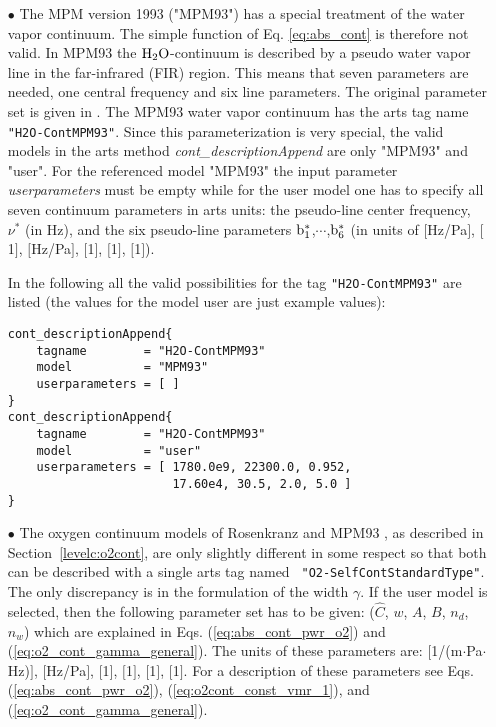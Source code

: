 \begin{itemize}
\item[$\bullet$] The MPM version 1993 ("MPM93") \citep{liebeetal:93} 
has a special treatment of the water vapor continuum. The simple 
function of Eq. \ref{eq:abs_cont} is therefore not valid. In MPM93 
the $\mbox{H}_2\mbox{O}$-continuum is described by a pseudo water vapor line in the 
far-infrared (FIR) region. This means that seven parameters are 
needed, one central frequency and six line parameters. The original 
parameter set is given in \cite{liebeetal:93}. The MPM93 water vapor 
continuum has the arts tag name {\tt "H2O-ContMPM93"}. Since this 
parameterization is very special, the valid models 
in the arts method {\it cont\_descriptionAppend} are only 
"MPM93" and "user". For the referenced model "MPM93" the 
input parameter {\it userparameters} must be empty while 
for the user model one has to specify all seven continuum 
parameters in arts units: the pseudo-line center frequency, 
$\nu^*$ (in Hz), and the six pseudo-line parameters $\rm b^*_{\rm 1}$,$\cdots$,$\rm b^*_{\rm 6}$ 
(in units of $[$Hz/Pa$]$, $[$1$]$, $[$Hz/Pa$]$, $[$1$]$, $[$1$]$, $[$1$]$).

In the following all the valid possibilities for the
tag {\tt "H2O-ContMPM93"} are listed (the values for the 
model user are just example values):
\begin{verbatim}
cont_descriptionAppend{
    tagname        = "H2O-ContMPM93"
    model          = "MPM93"
    userparameters = [ ]
}
cont_descriptionAppend{
    tagname        = "H2O-ContMPM93"
    model          = "user"
    userparameters = [ 1780.0e9, 22300.0, 0.952, 
                       17.60e4, 30.5, 2.0, 5.0 ]
}
\end{verbatim}


\item[$\bullet$] The oxygen continuum models of Rosenkranz
  \citep{pwr:93} and MPM93 \citep{liebeetal:93}, as described in
  Section~\ref{levelc:o2cont}, are only slightly dif\-ferent in some
  respect so that
  both can be described with a single arts tag named {\tt
    "O2-SelfContStandardType"}. The only discrepancy is in the
  formulation of the width $\gamma$. If the user model is selected,
  then the following parameter set has to be given: ($\widehat{C}$,
  $w$, $A$, $B$, $n_d$, $n_w$) which are explained in Eqs.
  (\ref{eq:abs_cont_pwr_o2}) and (\ref{eq:o2_cont_gamma_general}).
  The units of these parameters are: $[$1/(m$\cdot$Pa$\cdot$Hz)$]$,
  $[$Hz/Pa$]$, $[$1$]$, $[$1$]$, $[$1$]$, $[$1$]$. For a description
  of these parameters see Eqs. (\ref{eq:abs_cont_pwr_o2}),
  (\ref{eq:o2cont_const_vmr_1}), and (\ref{eq:o2_cont_gamma_general}).
  

\end{itemize}
